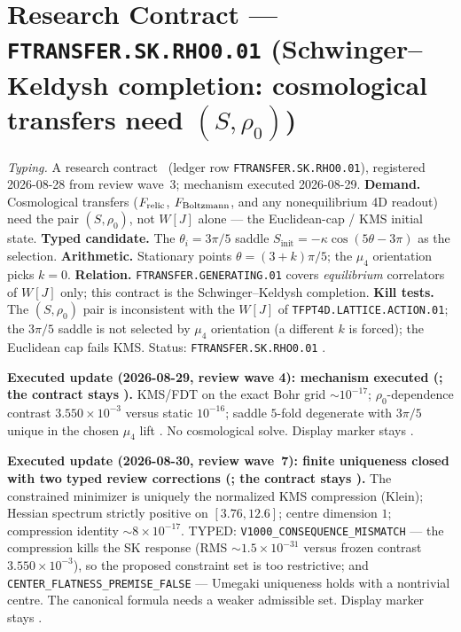\documentclass[11pt,a4paper]{article}
\begin{document}
\section*{Research Contract --- \texttt{FTRANSFER.SK.RHO0.01} (Schwinger--Keldysh completion: cosmological transfers need $(S,\rho_0)$)}
\noindent\emph{Typing.} A research contract \mO\ (ledger row \texttt{FTRANSFER.SK.RHO0.01}),
registered 2026-08-28 from review wave~3; mechanism executed 2026-08-29.  \textbf{Demand.}  Cosmological
transfers ($F_{\rm relic}$, $F_{\rm Boltzmann}$, and any nonequilibrium 4D readout) need the pair
$(S,\rho_0)$, not $W[J]$ alone --- the Euclidean-cap / KMS initial state.  \textbf{Typed
candidate.}  The $\theta_i=3\pi/5$ saddle $S_{\mathrm{init}}=-\kappa\cos(5\theta-3\pi)$ as the
selection.  \textbf{Arithmetic.}  Stationary points $\theta=(3+k)\pi/5$; the $\mu_4$ orientation
picks $k=0$.  \textbf{Relation.}  \texttt{FTRANSFER.GENERATING.01} covers \emph{equilibrium}
correlators of $W[J]$ only; this contract is the Schwinger--Keldysh completion.
\textbf{Kill tests.}  The $(S,\rho_0)$ pair is inconsistent with the $W[J]$ of
\texttt{TFPT4D.LATTICE.ACTION.01}; the $3\pi/5$ saddle is not selected by $\mu_4$ orientation (a
different $k$ is forced); the Euclidean cap fails KMS.
Status: \texttt{FTRANSFER.SK.RHO0.01} \mO.

\par\smallskip\noindent\textbf{Executed update (2026-08-29, review wave 4): mechanism executed
(; the contract stays \mO).}
KMS/FDT on the exact Bohr grid $\sim10^{-17}$; $\rho_0$-dependence contrast $3.550\times10^{-3}$
versus static $10^{-16}$; saddle $5$-fold degenerate with $3\pi/5$ unique in the chosen $\mu_4$
lift \mC.  No cosmological solve.  Display marker stays \mO.

\par\smallskip\noindent\textbf{Executed update (2026-08-30, review wave~7): finite uniqueness
closed with two typed review corrections
(; the contract stays \mO).}
The constrained minimizer is uniquely the normalized KMS compression (Klein); Hessian spectrum
strictly positive on $[3.76,12.6]$; centre dimension $1$; compression identity
$\sim8{\times}10^{-17}$.  TYPED: \texttt{V1000\_CONSEQUENCE\_MISMATCH} --- the compression
kills the SK response (RMS $\sim1.5{\times}10^{-31}$ versus frozen contrast
$3.550{\times}10^{-3}$), so the proposed constraint set is too restrictive; and
\texttt{CENTER\_FLATNESS\_PREMISE\_FALSE} --- Umegaki uniqueness holds with a nontrivial centre.
The canonical formula needs a weaker admissible set.  Display marker stays \mO.
\end{document}
